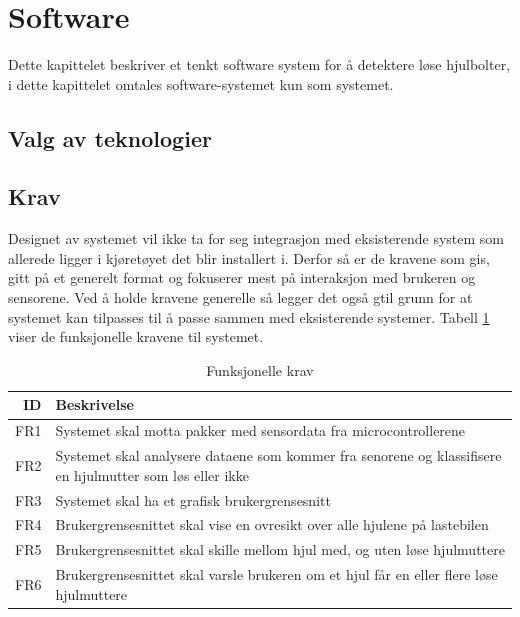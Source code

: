 \section{Software}
Dette kapittelet beskriver et tenkt software system for å detektere løse hjulbolter, i dette kapittelet omtales software-systemet kun som systemet.

\subsection{Valg av teknologier}

\subsection{Krav}
Designet av systemet vil ikke ta for seg integrasjon med eksisterende system som allerede ligger i kjøretøyet det blir installert i. Derfor så er de kravene som gis, gitt på et generelt format og fokuserer mest på interaksjon med brukeren og sensorene. Ved å holde kravene generelle så legger det også gtil grunn for at systemet kan tilpasses til å passe sammen med eksisterende systemer. Tabell \ref{tab:frequirements} viser de funksjonelle kravene til systemet.
\begin{table}[H]
\caption{Funksjonelle krav}
\label{tab:frequirements}
\begin{tabularx}{\textwidth}{r|X}
ID & Beskrivelse \\ 
\hline
FR1 & Systemet skal motta pakker med sensordata fra microcontrollerene \\
FR2 & Systemet skal analysere dataene som kommer fra senorene og klassifisere en hjulmutter som løs eller ikke \\
FR3 & Systemet skal ha et grafisk brukergrensesnitt \\
FR4 & Brukergrensesnittet skal vise en ovresikt over alle hjulene på lastebilen \\
FR5 & Brukergrensesnittet skal skille mellom hjul med, og uten løse hjulmuttere \\
FR6 & Brukergrensesnittet skal varsle brukeren om et hjul får en eller flere løse hjulmuttere \\
\hline
\end{tabularx}
\end{table}

